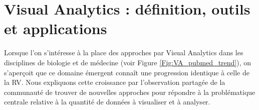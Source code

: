 






\section{Visual Analytics : définition, outils et applications}

Lorsque l'on s'intéresse à la place des approches par Visual Analytics dans les disciplines de biologie et de médecine (voir Figure \ref{Fig:VA_pubmed_trend}), on s'aperçoit que ce domaine émergent connaît une progression identique à celle de la RV. Nous expliquons cette croissance par l'observation partagée de la communauté de trouver de nouvelles approches pour répondre à la problématique centrale relative à  la quantité de données à visualiser et à analyser.

